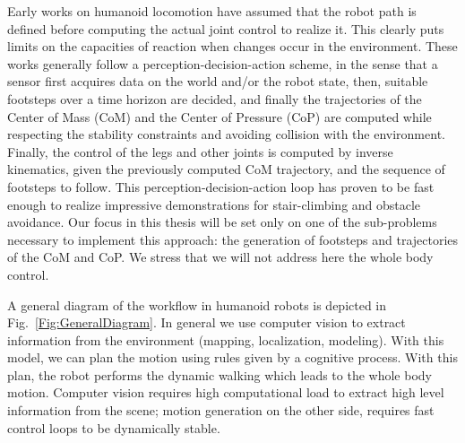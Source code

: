 Early works on humanoid locomotion have assumed that the robot path is defined before computing the actual joint control to realize it. This clearly puts limits on the capacities of reaction when changes occur in the environment. These works generally follow a perception-decision-action scheme, in the sense that a sensor first acquires data on the world and/or the robot state, then, suitable footsteps over a time horizon are decided, and finally the trajectories of the Center of Mass (CoM) and the Center of Pressure (CoP) are computed while respecting the stability constraints and avoiding collision with the environment. Finally, the control of the legs and other joints is computed by inverse kinematics, given the previously computed CoM trajectory, and the sequence of footsteps to follow. This perception-decision-action loop has proven to be fast enough  to realize impressive demonstrations for stair-climbing and obstacle avoidance. Our focus in this thesis will be set only on one of the sub-problems necessary to implement this approach: the generation of footsteps and trajectories of the CoM and CoP. We stress that we will not address here the whole body control.


A general diagram of the workflow in humanoid robots is depicted in Fig.~\ref{Fig:GeneralDiagram}. In general we use computer vision to extract information from the environment (mapping, localization, modeling). With this model, we can plan the motion using rules given by a cognitive process. With this plan, the robot performs the dynamic walking which leads to the whole body motion. Computer vision requires high computational load to extract high level information from the scene; motion generation on the other side, requires fast control loops to be dynamically stable. 

